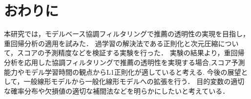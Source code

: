 \section{おわりに}
本研究では，モデルベース協調フィルタリングで推薦の透明性の実現を目指し，重回帰分析の適用を試みた．
過学習の解決法である正則化と次元圧縮について，スコアの予測精度などを検証する実験を行った．
実験の結果より，重回帰分析を応用した協調フィルタリングで推薦の透明性を実現する場合,スコア予測能力やモデル学習時間の観点からL1正則化が適していると考える.
今後の展望として，一般線形モデルから一般化線形モデルへの拡張を行う．
目的変数の適切な確率分布や欠損値の適切な補間法などを明らかにしたいと考えている．